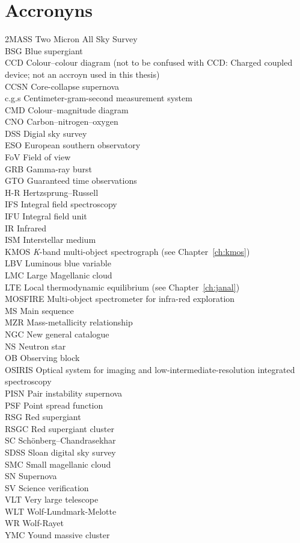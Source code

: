 \chapter{Accronyns}\label{ch:acc}
2MASS Two Micron All Sky Survey\\
BSG Blue supergiant\\
CCD Colour--colour diagram (not to be confused with CCD: Charged coupled device; not an accroyn used in this thesis)\\
CCSN Core-collapse supernova\\
c.g.s Centimeter-gram-second measurement system\\
CMD Colour--magnitude diagram\\
CNO Carbon--nitrogen--oxygen\\
DSS Digial sky survey\\
ESO European southern observatory\\
FoV Field of view\\
GRB Gamma-ray burst\\
GTO Guaranteed time observations\\
H-R Hertzsprung--Russell\\
IFS Integral field spectroscopy\\
IFU Integral field unit\\
IR Infrared\\
ISM Interstellar medium\\
KMOS {\it K}-band multi-object spectrograph (see Chapter~\ref{ch:kmos})\\
LBV Luminous blue variable\\
LMC Large Magellanic cloud\\
LTE Local thermodynamic equilibrium (see Chapter~\ref{ch:janal})\\
MOSFIRE Multi-object spectrometer for infra-red exploration\\
MS Main sequence\\
MZR Mass-metallicity relationship\\
NGC New general catalogue\\
NS Neutron star\\
OB Observing block\\
OSIRIS Optical system for imaging and low-intermediate-resolution integrated spectroscopy\\
PISN Pair instability supernova\\
PSF Point spread function\\
RSG Red supergiant\\
RSGC Red supergiant cluster\\
SC Sch\"onberg--Chandrasekhar\\
SDSS Sloan digital sky survey\\
SMC Small magellanic cloud\\
SN Supernova\\
SV Science verification\\
VLT Very large telescope\\
WLT Wolf-Lundmark-Melotte\\
WR Wolf-Rayet\\
YMC Yound massive cluster\\
